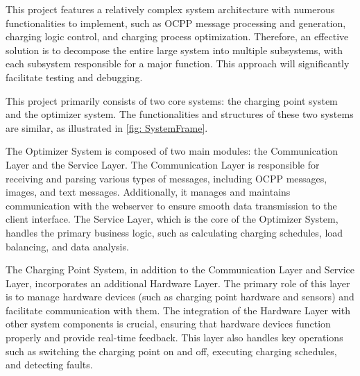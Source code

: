 \documentclass[
	english,
	ruledheaders=section,%
	class=report,%
	thesis={type=Report},%
	accentcolor=9c,%
	custommargins=true,%
	marginpar=false,%
	parskip=half-,%
	fontsize=11pt,%
	logofile={img/tuda_logo.pdf}, %
]{tudapub}
\begin{document}






This project features a relatively complex system architecture with numerous functionalities to implement, such as \ac{OCPP} message processing and generation, charging logic control, and charging process optimization. Therefore, an effective solution is to decompose the entire large system into multiple subsystems, with each subsystem responsible for a major function\cite{Softwarearchitecture}. This approach will significantly facilitate testing and debugging.

This project primarily consists of two core systems: the charging point system and the optimizer system. The functionalities and structures of these two systems are similar, as illustrated in \autoref{fig: SystemFrame}.


The Optimizer System is composed of two main modules: the Communication Layer and the Service Layer. The Communication Layer is responsible for receiving and parsing various types of messages, including \ac{OCPP} messages, images, and text messages. Additionally, it manages and maintains communication with the webserver to ensure smooth data transmission to the client interface. The Service Layer, which is the core of the Optimizer System, handles the primary business logic, such as calculating charging schedules, load balancing, and data analysis.

The Charging Point System, in addition to the Communication Layer and Service Layer, incorporates an additional Hardware Layer. The primary role of this layer is to manage hardware devices (such as charging point hardware and sensors) and facilitate communication with them. The integration of the Hardware Layer with other system components is crucial, ensuring that hardware devices function properly and provide real-time feedback. This layer also handles key operations such as switching the charging point on and off, executing charging schedules, and detecting faults.
\end{document}
